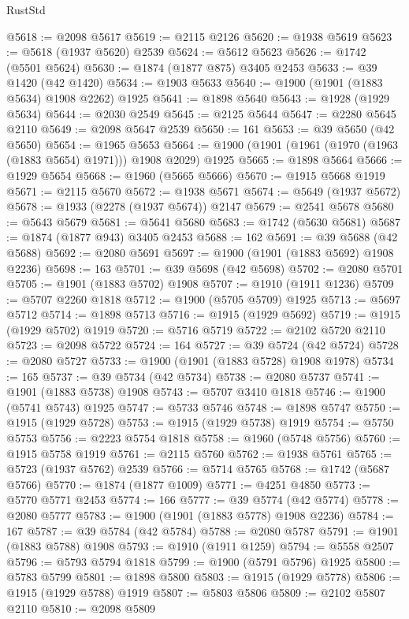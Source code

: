 \begin{lexlean}{RustStd}
\begin{coremodule}
@5618 := @2098 @5617
@5619 := @2115 @2126
@5620 := @1938 @5619
@5623 := @5618 (@1937 @5620) @2539
@5624 := @5612 @5623
@5626 := @1742 (@5501 @5624)
@5630 := @1874 (@1877 @875) @3405 @2453
@5633 := @39 @1420 (@42 @1420)
@5634 := @1903 @5633
@5640 := @1900 (@1901 (@1883 @5634) @1908 @2262) @1925
@5641 := @1898 @5640
@5643 := @1928 (@1929 @5634)
@5644 := @2030 @2549
@5645 := @2125 @5644
@5647 := @2280 @5645 @2110
@5649 := @2098 @5647 @2539
@5650 := 161
@5653 := @39 @5650 (@42 @5650)
@5654 := @1965 @5653
@5664 := @1900 (@1901 (@1961 (@1970 (@1963 (@1883 @5654) @1971))) @1908 @2029) @1925
@5665 := @1898 @5664
@5666 := @1929 @5654
@5668 := @1960 (@5665 @5666)
@5670 := @1915 @5668 @1919
@5671 := @2115 @5670
@5672 := @1938 @5671
@5674 := @5649 (@1937 @5672)
@5678 := @1933 (@2278 (@1937 @5674)) @2147
@5679 := @2541 @5678
@5680 := @5643 @5679
@5681 := @5641 @5680
@5683 := @1742 (@5630 @5681)
@5687 := @1874 (@1877 @943) @3405 @2453
@5688 := 162
@5691 := @39 @5688 (@42 @5688)
@5692 := @2080 @5691
@5697 := @1900 (@1901 (@1883 @5692) @1908 @2236)
@5698 := 163
@5701 := @39 @5698 (@42 @5698)
@5702 := @2080 @5701
@5705 := @1901 (@1883 @5702) @1908
@5707 := @1910 (@1911 @1236)
@5709 := @5707 @2260 @1818
@5712 := @1900 (@5705 @5709) @1925
@5713 := @5697 @5712
@5714 := @1898 @5713
@5716 := @1915 (@1929 @5692)
@5719 := @1915 (@1929 @5702) @1919
@5720 := @5716 @5719
@5722 := @2102 @5720 @2110
@5723 := @2098 @5722
@5724 := 164
@5727 := @39 @5724 (@42 @5724)
@5728 := @2080 @5727
@5733 := @1900 (@1901 (@1883 @5728) @1908 @1978)
@5734 := 165
@5737 := @39 @5734 (@42 @5734)
@5738 := @2080 @5737
@5741 := @1901 (@1883 @5738) @1908
@5743 := @5707 @3410 @1818
@5746 := @1900 (@5741 @5743) @1925
@5747 := @5733 @5746
@5748 := @1898 @5747
@5750 := @1915 (@1929 @5728)
@5753 := @1915 (@1929 @5738) @1919
@5754 := @5750 @5753
@5756 := @2223 @5754 @1818
@5758 := @1960 (@5748 @5756)
@5760 := @1915 @5758 @1919
@5761 := @2115 @5760
@5762 := @1938 @5761
@5765 := @5723 (@1937 @5762) @2539
@5766 := @5714 @5765
@5768 := @1742 (@5687 @5766)
@5770 := @1874 (@1877 @1009)
@5771 := @4251 @4850
@5773 := @5770 @5771 @2453
@5774 := 166
@5777 := @39 @5774 (@42 @5774)
@5778 := @2080 @5777
@5783 := @1900 (@1901 (@1883 @5778) @1908 @2236)
@5784 := 167
@5787 := @39 @5784 (@42 @5784)
@5788 := @2080 @5787
@5791 := @1901 (@1883 @5788) @1908
@5793 := @1910 (@1911 @1259)
@5794 := @5558 @2507
@5796 := @5793 @5794 @1818
@5799 := @1900 (@5791 @5796) @1925
@5800 := @5783 @5799
@5801 := @1898 @5800
@5803 := @1915 (@1929 @5778)
@5806 := @1915 (@1929 @5788) @1919
@5807 := @5803 @5806
@5809 := @2102 @5807 @2110
@5810 := @2098 @5809

\end{coremodule}
\end{lexlean}
